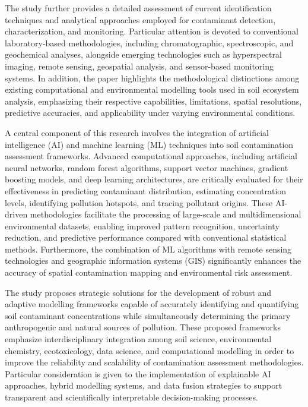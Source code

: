 \documentclass[preprint,12pt]{elsarticle}            %
\begin{document}
The study further provides a detailed assessment of current identification
techniques and analytical approaches employed for contaminant detection,
characterization, and monitoring. Particular attention is devoted to
conventional laboratory-based methodologies, including chromatographic,
spectroscopic, and geochemical analyses, alongside emerging technologies such
as hyperspectral imaging, remote sensing, geospatial analysis, and
sensor-based monitoring systems. In addition, the paper highlights the
methodological distinctions among existing computational and environmental
modelling tools used in soil ecosystem analysis, emphasizing their respective
capabilities, limitations, spatial resolutions, predictive accuracies, and
applicability under varying environmental conditions.

A central component of this research involves the integration of artificial
intelligence (AI) and machine learning (ML) techniques into soil contamination
assessment frameworks. Advanced computational approaches, including artificial
neural networks, random forest algorithms, support vector machines, gradient
boosting models, and deep learning architectures, are critically evaluated for
their effectiveness in predicting contaminant distribution, estimating
concentration levels, identifying pollution hotspots, and tracing pollutant
origins. These AI-driven methodologies facilitate the processing of large-scale
and multidimensional environmental datasets, enabling improved pattern
recognition, uncertainty reduction, and predictive performance compared with
conventional statistical methods. Furthermore, the combination of ML algorithms
with remote sensing technologies and geographic information systems (GIS)
significantly enhances the accuracy of spatial contamination mapping and
environmental risk assessment.

The study proposes strategic solutions for the development of robust and
adaptive modelling frameworks capable of accurately identifying and quantifying
soil contaminant concentrations while simultaneously determining the primary
anthropogenic and natural sources of pollution. These proposed frameworks
emphasize interdisciplinary integration among soil science, environmental
chemistry, ecotoxicology, data science, and computational modelling in order
to improve the reliability and scalability of contamination assessment
methodologies. Particular consideration is given to the implementation of
explainable AI approaches, hybrid modelling systems, and data fusion strategies
to support transparent and scientifically interpretable decision-making
processes.
\end{document}
